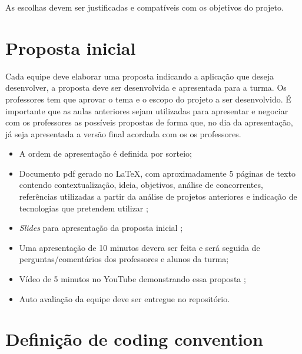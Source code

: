 As escolhas devem ser justificadas e compatíveis com os objetivos do projeto.


\section{Proposta inicial}\label{atv-proposta-inicial}
Cada equipe deve elaborar uma proposta indicando a aplicação que deseja desenvolver, a proposta deve ser desenvolvida e apresentada para a turma. Os professores tem que aprovar o tema e o escopo do projeto a ser desenvolvido. É importante que as aulas anteriores sejam utilizadas para apresentar e negociar com os professores as possíveis propostas de forma que, no dia da apresentação, já seja apresentada a versão final acordada com os os professores.


\begin{itemize}

    \item A ordem de apresentação é definida por sorteio;
    
    \item Documento \ac{pdf} gerado no \LaTeX, com aproximadamente 5 páginas de texto contendo contextualização, ideia, objetivos, análise de concorrentes, referências utilizadas a partir da análise de projetos anteriores  e indicação de tecnologias que pretendem utilizar ;
    
    \item \emph{Slides} para apresentação da proposta inicial ;
    
    \item Uma apresentação de 10 minutos devera ser feita e será seguida de perguntas/comentários dos professores e alunos da turma;

    \item Vídeo de 5 minutos no YouTube demonstrando essa proposta ;
    
    \item Auto avaliação da equipe  deve ser entregue no repositório.
\end{itemize}



\section{Definição de coding convention}\label{atv-coding-convention}

